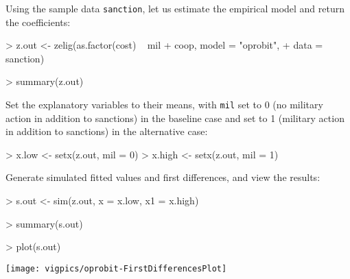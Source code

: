 \begin{enumerate}
Using the sample data \texttt{sanction}, let us estimate the empirical model and return the coefficients:
\begin{Schunk}
\begin{Sinput}
> z.out <- zelig(as.factor(cost) ~ mil + coop, model = "oprobit", 
+     data = sanction)
\end{Sinput}
\end{Schunk}
\begin{Schunk}
\begin{Sinput}
> summary(z.out)
\end{Sinput}
\end{Schunk}
Set the explanatory variables to their means, with {\tt mil} set
to 0 (no military action in addition to sanctions) in the baseline
case and set to 1 (military action in addition to sanctions) in the
alternative case:
\begin{Schunk}
\begin{Sinput}
> x.low <- setx(z.out, mil = 0)
> x.high <- setx(z.out, mil = 1)
\end{Sinput}
\end{Schunk}
Generate simulated fitted values and first differences, and view the results:
\begin{Schunk}
\begin{Sinput}
> s.out <- sim(z.out, x = x.low, x1 = x.high)
\end{Sinput}
\end{Schunk}
\begin{Schunk}
\begin{Sinput}
> summary(s.out)
\end{Sinput}
\end{Schunk}
\begin{center}
\begin{Schunk}
\begin{Sinput}
> plot(s.out)
\end{Sinput}
\end{Schunk}
\texttt{[image: vigpics/oprobit-FirstDifferencesPlot]}
\end{center}
\end{enumerate}

